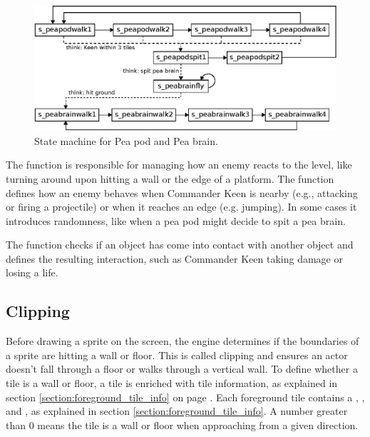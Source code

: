 \documentclass[book.tex]{subfiles}
\begin{document}
\begin{figure}[H]
  \centering
  \includegraphics[width=\textwidth]{imgs/drawings/state_machine.eps}
  \caption{State machine for Pea pod and Pea brain.}
  \label{fig:state_machine}  
\end{figure}

\par
The  function is responsible for managing how an enemy reacts to the level, like turning around upon hitting a wall or the edge of a platform. The  function defines how an enemy behaves when Commander Keen is nearby (e.g., attacking or firing a projectile) or when it reaches an edge (e.g. jumping). In some cases it introduces randomness, like when a pea pod might decide to spit a pea brain.\\

\par
\begin{minipage}{\textwidth}
  
\end{minipage}
\label{state_type}

\par
The  function checks if an object has come into contact with another object and defines the resulting interaction, such as Commander Keen taking damage or losing a life.



\subsection{Clipping}
\label{section:clipping}
Before drawing a sprite on the screen, the engine determines if the boundaries of a sprite are hitting a wall or floor. This is called clipping and ensures an actor doesn't fall through a floor or walks through a vertical wall. To define whether a tile is a wall or floor, a tile is enriched with tile information, as explained in section \ref{section:foreground_tile_info} on page \pageref{section:foreground_tile_info}. Each foreground tile contains a , ,  and , as explained in section \ref{section:foreground_tile_info}. A number greater than 0 means the tile is a wall or floor when approaching from a given direction. 
\end{document}
